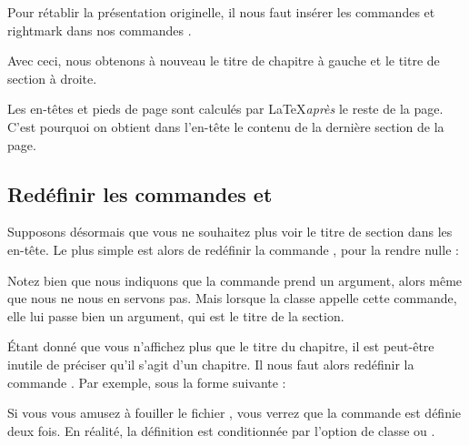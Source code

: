 Pour rétablir la présentation originelle, il nous faut insérer les commandes  et {rightmark} dans nos commandes .

\begin{latexcode}
\fancyhead[LE,RO]{}
\fancyhead[RE]{\leftmark}
\fancyhead[LO]{\rightmark}
\end{latexcode}

Avec ceci, nous obtenons à nouveau le titre de chapitre à gauche et le titre de section à droite.

\begin{attention}
Les en-têtes et pieds de page sont calculés par \LaTeX \emph{après} le reste de la page. C'est pourquoi on obtient dans l'en-tête le contenu de la dernière section de la page.
\end{attention}

\subsection{Redéfinir les commandes  et }

Supposons désormais que vous ne souhaitez plus voir le titre de section dans les en-tête. Le plus simple est alors de redéfinir la commande , pour la rendre nulle :

\begin{latexcode}
\renewcommand{\sectionmark}[1]{}
\end{latexcode}

\begin{attention}
Notez bien que nous indiquons que la commande  prend un argument, alors même que nous ne nous en servons pas. Mais lorsque la classe  appelle cette commande, elle lui passe bien un argument, qui est le titre de la section.
\end{attention}

Étant donné que vous n'affichez plus que le titre du chapitre, il est peut-être inutile de préciser qu'il s'agit d'un chapitre. Il nous faut alors redéfinir la commande . Par exemple, sous la forme suivante :

\begin{latexcode}
\renewcommand{\chaptermark}[1]{\markboth {\MakeUppercase{%
    \thechapter #1}}{}}
\end{latexcode}


\begin{plusloins}
Si vous vous amusez à fouiller le fichier , vous verrez que la commande  est définie deux fois. En réalité, la définition est conditionnée par l'option de classe  ou .
\end{plusloins}
